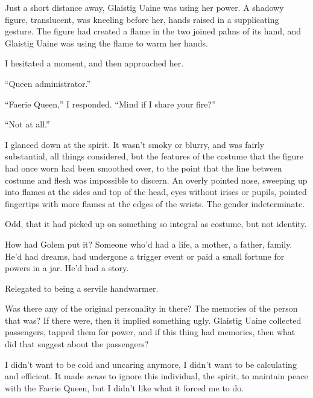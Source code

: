 Just a short distance away, Glaistig Uaine was using her power.  A shadowy figure, translucent, was kneeling before her, hands raised in a supplicating gesture.  The figure had created a flame in the two joined palms of its hand, and Glaistig Uaine was using the flame to warm her hands.



I hesitated a moment, and then approached her.



``Queen administrator.''



``Faerie Queen,'' I responded.  ``Mind if I share your fire?''



``Not at all.''



I glanced down at the spirit.  It wasn't smoky or blurry, and was fairly substantial, all things considered, but the features of the costume that the figure had once worn had been smoothed over, to the point that the line between costume and flesh was impossible to discern.  An overly pointed nose, sweeping up into flames at the sides and top of the head, eyes without irises or pupils, pointed fingertips with more flames at the edges of the wrists.  The gender indeterminate.



Odd, that it had picked up on something so integral as costume, but not identity.



How had Golem put it?  Someone who'd had a life, a mother, a father, family.  He'd had dreams, had undergone a trigger event or paid a small fortune for powers in a jar.  He'd had a story.



Relegated to being a servile handwarmer.



Was there any of the original personality in there?  The memories of the person that was?  If there were, then it implied something ugly.  Glaistig Uaine collected passengers, tapped them for power, and if this thing had memories, then what did that suggest about the passengers?



I didn't want to be cold and uncaring anymore, I didn't want to be calculating and efficient.  It made \emph{sense} to ignore this individual, the spirit, to maintain peace with the Faerie Queen, but I didn't like what it forced me to do.



